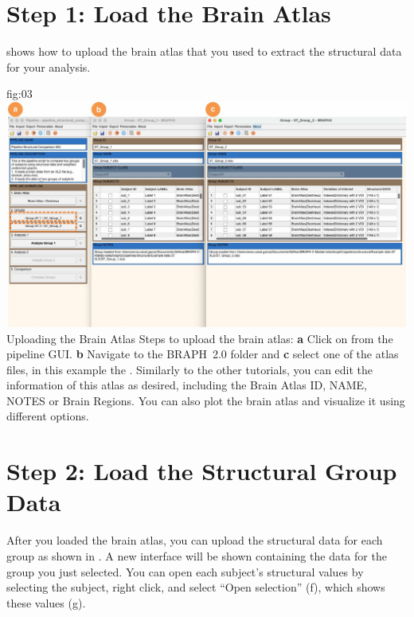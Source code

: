\documentclass[justified]{tufte-handout}
\begin{document}
\section{Step 1: Load the Brain Atlas}

 shows how to upload the brain atlas that you used to extract the structural data for your analysis.

	{fig:03}
	{
	\includegraphics{fig03.jpg}
	}
	{Uploading the Brain Atlas}
	{
	Steps to upload the brain atlas:
	{\bf a} Click on  from the pipeline GUI.
	{\bf b} Navigate to the BRAPH~2.0 folder  and {\bf c} select one of the atlas files, in this example the . Similarly to the other tutorials, you can edit the information of this atlas as desired, including the Brain Atlas ID, NAME, NOTES or Brain Regions. You can also plot the brain atlas and visualize it using different options.
	}
 
\section{Step 2: Load the Structural Group Data}

After you loaded the brain atlas, you can upload the structural data for each group as shown in . A new interface will be shown containing the data for the group you just selected. You can open each subject’s structural values by selecting
the subject, right click, and select “Open selection” (f), which shows these values (g). 
	
\end{document}
